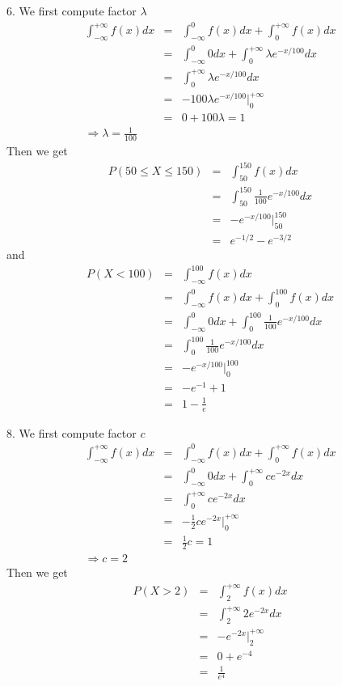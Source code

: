 \documentclass[12pt]{article}
\begin{document}
6. We first compute factor $\lambda$
\begin{eqnarray*}
  \int_{-\infty}^{+\infty} f(x) dx
  &=& \int_{-\infty}^{0} f(x) dx + \int_{0}^{+\infty} f(x) dx \\
  &=& \int_{-\infty}^{0} 0 dx + \int_{0}^{+\infty} \lambda e^{-x/100} dx \\
  &=& \int_{0}^{+\infty} \lambda e^{-x/100} dx \\
  &=& -100 \lambda e^{-x/100}|_0^{+\infty} \\
  &=& 0 + 100 \lambda = 1 \\
  \Longrightarrow \lambda = \frac {1}{100}
\end{eqnarray*}
Then we get
\begin{eqnarray*}
  P(50 \le X \le 150)
  &=& \int_{50}^{150} f(x) dx \\
  &=& \int_{50}^{150} \frac {1}{100} e^{-x/100} dx \\
  &=& -e^{-x/100}|_{50}^{150} \\
  &=& e^{-1/2}-e^{-3/2}
\end{eqnarray*}
and
\begin{eqnarray*}
  P(X < 100)
  &=& \int_{-\infty}^{100} f(x) dx \\
  &=& \int_{-\infty}^{0} f(x) dx + \int_{0}^{100} f(x) dx \\
  &=& \int_{-\infty}^{0} 0 dx + \int_{0}^{100} \frac {1}{100} e^{-x/100} dx \\
  &=& \int_{0}^{100} \frac {1}{100} e^{-x/100} dx \\
  &=& -e^{-x/100}|_0^{100} \\
  &=& -e^{-1} + 1 \\
  &=& 1 - \frac {1}{e}
\end{eqnarray*}

8. We first compute factor $c$
\begin{eqnarray*}
  \int_{-\infty}^{+\infty} f(x) dx
  &=& \int_{-\infty}^{0} f(x) dx + \int_{0}^{+\infty} f(x) dx \\
  &=& \int_{-\infty}^{0} 0 dx + \int_{0}^{+\infty} c e^{-2x} dx \\
  &=& \int_{0}^{+\infty} c e^{-2x} dx \\
  &=& - \frac {1}{2} c e^{-2x}|_0^{+\infty} \\
  &=& \frac {1}{2} c = 1 \\
  \Longrightarrow c = 2
\end{eqnarray*}
Then we get
\begin{eqnarray*}
  P(X > 2)
  &=& \int_{2}^{+\infty} f(x) dx \\
  &=& \int_{2}^{+\infty} 2 e^{-2x} dx \\
  &=& -e^{-2x}|_{2}^{+\infty} \\
  &=& 0 + e^{-4} \\
  &=& \frac {1}{e^4}
\end{eqnarray*}
\end{document}

